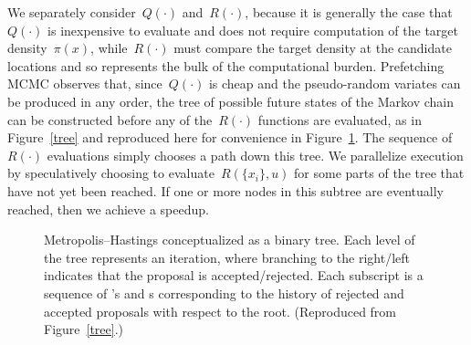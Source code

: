 \documentclass[angelino.tex]{subfiles}
\begin{document}
We separately consider~$Q(\cdot)$ and~$R(\cdot)$, because it is generally the case that~$Q(\cdot)$ is inexpensive to evaluate and does not require computation of the target density~$\pi(x)$, while~$R(\cdot)$ must compare the target density at the candidate locations and so represents the bulk of the computational burden.  Prefetching MCMC observes that, since~$Q(\cdot)$ is cheap and the pseudo-random variates can be produced in any order, the tree of possible future states of the Markov chain can be constructed before any of the~$R(\cdot)$ functions are evaluated, as in Figure~\ref{tree} and reproduced here for convenience in Figure~\ref{tree-copy}.  The sequence of~$R(\cdot)$ evaluations simply chooses a path down this tree.  
We parallelize execution by speculatively choosing to evaluate~$R(\{x_i\}, u)$ for some parts of the tree that have not yet been reached.  If one or more nodes in this subtree are eventually reached, then we achieve a speedup.

\begin{figure}[t!]
  \centering%
  \caption{Metropolis--Hastings conceptualized as a binary tree.
  Each level of the tree represents an iteration, where branching to the
  right/left indicates that the proposal is accepted/rejected.
  Each subscript is a sequence of 's and s
  corresponding to the history of rejected and accepted proposals
  with respect to the root.  
  (Reproduced from Figure~\ref{tree}.)
  }
  \label{tree-copy}
\end{figure}
\end{document}
